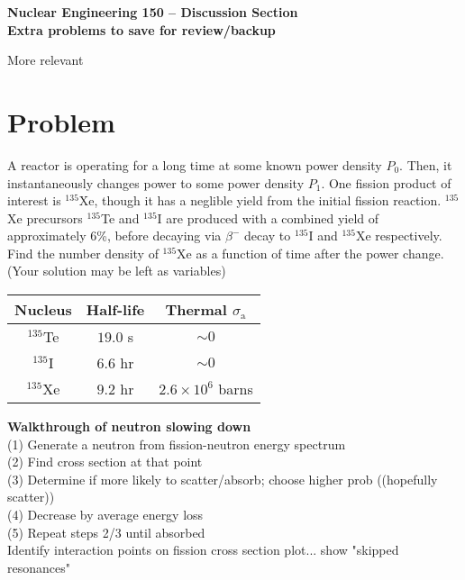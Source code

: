 \documentclass{report}
\begin{document}
\begin{center}
\textbf{\large Nuclear Engineering 150 -- Discussion Section}\\ 
\textbf{Extra problems to save for review/backup}
\end{center}
\vspace{1cm}


{\huge More relevant}

\section*{Problem}

A reactor is operating for a long time at some known power density $P_0$. Then, it instantaneously changes power to some power density $P_1$. One fission product of interest is $^{135}$Xe, though it has a neglible yield from the initial fission reaction. $^{135}$Xe precursors $^{135}$Te and $^{135}$I are produced with a combined yield of approximately 6\%, before decaying via $\beta^{-}$ decay to $^{135}$I and $^{135}$Xe respectively. Find the number density of $^{135}$Xe as a function of time after the power change. (Your solution may be left as variables)

\begin{table}[htbp]
	\centering
	\begin{tabular}{|c|c|c|}
			\hline
			Nucleus		&	Half-life 	& Thermal $\sigma_{\text{a}}$ \\
			\hline
			$^{135}$Te	&  $19.0$ s 	& $\sim 0$\\
			$^{135}$I	&  $6.6$ hr 	& $\sim 0$\\
			$^{135}$Xe	&  $9.2$ hr 	& $2.6 \times 10^6$ barns \\
			\hline
	\end{tabular}
	\label{tab:design-specs}
\end{table}


\textbf{Walkthrough of neutron slowing down}\\
(1) Generate a neutron from fission-neutron energy spectrum\\
(2) Find cross section at that point\\
(3) Determine if more likely to scatter/absorb; choose higher prob ((hopefully scatter))\\
(4) Decrease by average energy loss\\
(5) Repeat steps 2/3 until absorbed\\
Identify interaction points on fission cross section plot... show "skipped resonances"
\end{document}
